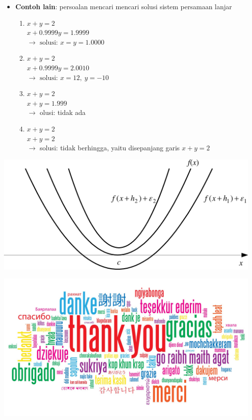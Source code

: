\documentclass[pdflatex,compress]{beamer}
\begin{document}
\begin{frame}
	\begin{itemize}
		\item \textbf{Contoh lain}: persoalan mencari mencari solusi sistem persamaan lanjar
		\begin{enumerate}
			\item $ x+y=2 $\\
			$ x+0.9999y = 1.9999 $\\
			$ \rightarrow \text{ solusi: } x = y = 1.0000$
			\item $ x+y=2 $\\
			$ x+0.9999y = 2.0010 $\\
			$ \rightarrow \text{ solusi: } x = 12,~y = -10$
			\item $ x+y=2 $\\
			$ x+y = 1.999 $\\
			$ \rightarrow $ olusi: tidak ada			
			\item $ x+y=2 $\\
			$ x+y = 2 $\\
			$ \rightarrow $ solusi: tidak berhingga, yaitu disepanjang garis $ x + y = 2 $
		\end{enumerate}
	\end{itemize}
\end{frame}

\begin{frame}
	\begin{center}
		\includegraphics[width=\linewidth]{img/img107}
	\end{center}
\end{frame}

\begin{frame}
	\begin{center}
		\includegraphics[width=\linewidth]{../../../img/thank_you.jpg}
	\end{center}
\end{frame}
\end{document}
